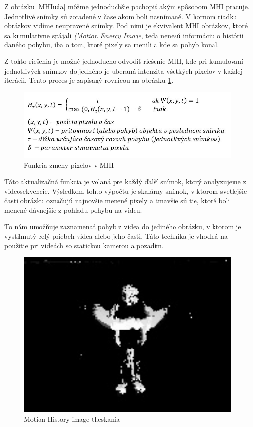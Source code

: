 Z obrázku \ref{MHIuda} môžme jednoduchšie pochopiť akým spôsobom MHI pracuje. Jednotlivé snímky sú zoradené v čase akom boli nasnímané. V hornom riadku obrázkov vidíme neupravené snímky. Pod nimi je ekvivalent MHI obrázkov, ktoré sa kumulatívne spájali \textit{(Motion Energy Image}, teda nenesú informáciu o histórii daného pohybu, iba o tom, ktoré pixely sa menili a kde sa pohyb konal. 

Z tohto riešenia je možné jednoducho odvodiť riešenie MHI, kde pri kumulovaní jednotlivých snímkov do jedného je uberaná intenzita všetkých pixelov v každej iterácii. Tento proces je zapísaný rovnicou na obrázku \ref{MHIeq}.

\begin{figure}[H]
  \centering
  \includegraphics[width=14cm]{img/MHIeq.jpg}
  \caption{Funkcia zmeny pixelov v MHI}
  \label{MHIeq}
\end{figure}

Táto aktualizačná funkcia je volaná pre každý ďalší snímok, ktorý analyzujeme z videosekvencie. Výsledkom tohto výpočtu je skalárny snímok, v ktorom svetlejšie časti obrázku označujú najnovšie menené pixely a tmavšie sú tie, ktoré boli menené dávnejšie z pohľadu pohybu na videu.

To nám umožňuje zaznamenať pohyb z videa do jediného obrázku, v ktorom je vystihnutý celý priebeh videa alebo jeho časti. Táto technika je vhodná na použitie pri videách so statickou kamerou a pozadím.\cite{c10}

\begin{figure}[H]
  \centering
  \includegraphics[width=13cm]{img/MHIclap.jpg}
  \caption{Motion History image tlieskania}
  \label{MHIclap}
\end{figure}

